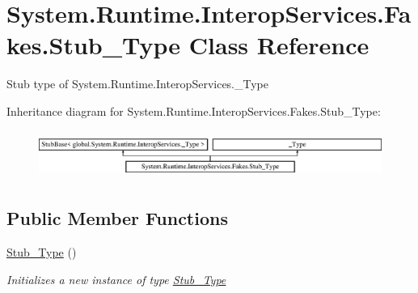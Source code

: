 \hypertarget{class_system_1_1_runtime_1_1_interop_services_1_1_fakes_1_1_stub___type}{\section{System.\-Runtime.\-Interop\-Services.\-Fakes.\-Stub\-\_\-\-Type Class Reference}
\label{class_system_1_1_runtime_1_1_interop_services_1_1_fakes_1_1_stub___type}
}


Stub type of System.\-Runtime.\-Interop\-Services.\-\_\-\-Type 


Inheritance diagram for System.\-Runtime.\-Interop\-Services.\-Fakes.\-Stub\-\_\-\-Type\-:\begin{figure}[H]
\begin{center}
\leavevmode
\includegraphics[height=1.577465cm]{class_system_1_1_runtime_1_1_interop_services_1_1_fakes_1_1_stub___type}
\end{center}
\end{figure}
\subsection*{Public Member Functions}
\begin{DoxyCompactItemize}
\item 
\hyperlink{class_system_1_1_runtime_1_1_interop_services_1_1_fakes_1_1_stub___type_ab1d0f4054f39bd38e003056757287b37}{Stub\-\_\-\-Type} ()
\begin{DoxyCompactList}\small\item\em Initializes a new instance of type \hyperlink{class_system_1_1_runtime_1_1_interop_services_1_1_fakes_1_1_stub___type}{Stub\-\_\-\-Type}\end{DoxyCompactList}\end{DoxyCompactItemize}
